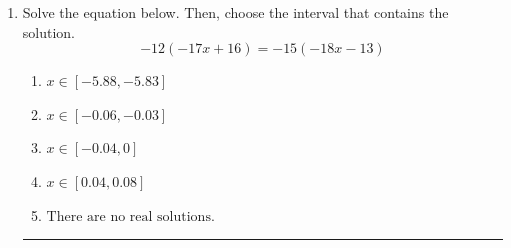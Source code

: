 \documentclass[14pt]{extbook}
\newcommand{\litem}[1]{\item#1\hspace*{-1cm}\rule{\textwidth}{0.4pt}}
\begin{document}
\begin{enumerate}
{\begin{enumerate}[label=\Alph*.]
\end{enumerate} }
\litem{
Solve the equation below. Then, choose the interval that contains the solution.\[ -12(-17x + 16) = -15(-18x -13) \]\begin{enumerate}[label=\Alph*.]
\item \( x \in [-5.88, -5.83] \)
\item \( x \in [-0.06, -0.03] \)
\item \( x \in [-0.04, 0] \)
\item \( x \in [0.04, 0.08] \)
\item \( \text{There are no real solutions.} \)

\end{enumerate} }
\end{enumerate}
\end{document}
